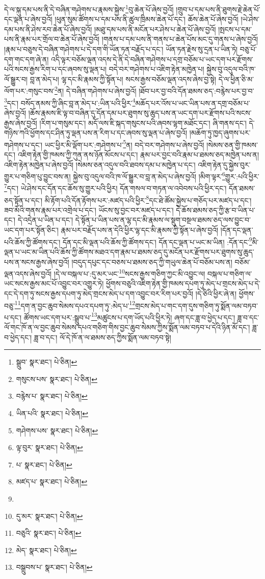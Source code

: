 དེ་ལ་སྐུ་དམ་པས་ནི་དེ་བཞིན་གཤེགས་པ་རྣམས་སྐྱེས་\footnote{སྒྲུབ་  སྣར་ཐང་།  པེ་ཅིན། }བུ་ཆེན་པོ་ཞེས་བྱའོ། །གྲུབ་པ་དམ་པས་ནི་ཐུགས་རྗེ་ཆེན་པོ་དང་ལྡན་པ་ཞེས་བྱའོ། །ཕུན་སུམ་ཚོགས་པ་དམ་པས་ནི་ཚུལ་ཁྲིམས་ཆེན་པོ་དང་། ཆོས་ཆེན་པོ་ཞེས་བྱའོ། །ཡེ་ཤེས་དམ་པས་ནི་ཤེས་རབ་ཆེན་པོ་ཞེས་བྱའོ། །མཐུ་དམ་པས་ནི་མངོན་པར་ཤེས་པ་ཆེན་པོ་ཞེས་བྱའོ། །སྤངས་པ་དམ་པས་ནི་རྣམ་པར་གྲོལ་བ་ཆེན་པོ་ཞེས་བྱའོ། །གནས་པ་དམ་པས་ནི་གནས་པ་ཆེན་པོས་མང་དུ་གནས་པ་ཞེས་བྱའོ། །རྣམ་པ་བཅུས་དེ་བཞིན་གཤེགས་པ་དེ་དག་གི་ཡོན་ཏན་བརྗོད་པ་དང་། ཡོན་ཏན་རྗེས་སུ་དྲན་པ་ཡིན་ཏེ། བཅུ་པོ་དག་གང་དག་ཞེ་ན། འདི་ལྟར་བཅོམ་ལྡན་འདས་དེ་ནི་དེ་བཞིན་གཤེགས་པ་དགྲ་བཅོམ་པ་ཡང་དག་པར་རྫོགས་པའི་སངས་རྒྱས་རིག་པ་དང་ཞབས་སུ་ལྡན་པ། བདེ་བར་གཤེགས་པ་འཇིག་རྟེན་མཁྱེན་པ། སྐྱེས་བུ་འདུལ་བའི་ཁ་ལོ་སྒྱུར་བ། བླ་ན་མེད་པ། ལྷ་དང་མི་རྣམས་ཀྱི་སྟོན་པ། སངས་རྒྱས་བཅོམ་ལྡན་འདས་ཞེས་བྱ་སྟེ། དེ་ལ་ཕྱིན་ཅི་མ་ལོག་པར་:གསུང་བས་\footnote{གསུངས་པས་  སྣར་ཐང་།  པེ་ཅིན། }ན། དེ་བཞིན་གཤེགས་པ་ཞེས་བྱའོ། །ཐོབ་པར་བྱ་བའི་དོན་ཐམས་ཅད་:བརྙེས་པར་བྱ་བ་\footnote{བརྙེས་པ་  སྣར་ཐང་།  པེ་ཅིན། }དང་། བསོད་ནམས་ཀྱི་ཞིང་བླ་ན་མེད་པ་:ཡིན་པའི་ཕྱིར་\footnote{ཡིན་པའི་  སྣར་ཐང་།  པེ་ཅིན། }མཆོད་པར་འོས་པ་ཡང་ཡིན་པས་ན་དགྲ་བཅོམ་པ་ཞེས་བྱའོ། །ཆོས་རྣམས་ཇི་ལྟ་བ་བཞིན་དུ་དོན་དམ་པར་ཐུགས་སུ་ཆུད་པས་ན་ཡང་དག་པར་རྫོགས་པའི་སངས་རྒྱས་ཞེས་བྱའོ། །རིག་པ་གསུམ་དང་། མདོ་ལས་ཇི་སྐད་གསུངས་པའི་ཞབས་ལྷག་མཐོང་དང་། ཞི་གནས་དང་། དེ་གཉིས་ཀའི་ཕྱོགས་དང་ཤིན་ཏུ་ལྡན་པས་ན་རིག་པ་དང་ཞབས་སུ་ལྡན་པ་ཞེས་བྱའོ། །མཆོག་ཏུ་ཁྱད་ཞུགས་པར་གཤེགས་པ་དང་། ཡང་ཕྱིར་མི་ལྡོག་པར་:གཤེགས་པ་\footnote{གཤེགས་པས་  སྣར་ཐང་།  པེ་ཅིན། }ན། བདེ་བར་གཤེགས་པ་ཞེས་བྱའོ། །སེམས་ཅན་གྱི་ཁམས་དང་། འཇིག་རྟེན་གྱི་ཁམས་ཀྱི་ཀུན་ནས་ཉོན་མོངས་པ་དང་། རྣམ་པར་བྱང་བའི་རྣམ་པ་ཐམས་ཅད་མཁྱེན་པས་ན། འཇིག་རྟེན་མཁྱེན་པ་ཞེས་བྱའོ། །སེམས་ཅན་འདུལ་བའི་ཐབས་དམ་པ་མཁྱེན་པ་དང་། འཇིག་རྟེན་དུ་སྐྱེས་བུར་གྱུར་པ་གཅིག་པུ་བྱུང་བས་ན། སྐྱེས་བུ་འདུལ་བའི་ཁ་ལོ་སྒྱུར་བ་བླ་ན་མེད་པ་ཞེས་བྱའོ། །མིག་ལྟར་\footnote{ལྟ་བུར་  སྣར་ཐང་།  པེ་ཅིན། }གྱུར་:པའི་ཕྱིར་\footnote{པ་  སྣར་ཐང་།  པེ་ཅིན། }དང་། ཡེ་ཤེས་དང་དོན་དང་ཆོས་སུ་གྱུར་པའི་ཕྱིར། དོན་གསལ་བ་གཏན་ལ་འབེབས་པའི་ཕྱིར་དང་། དོན་ཐམས་ཅད་སྟོན་པ་དང་། མི་རྟོག་པའི་དོན་རྟོགས་པར་:མཛད་པའི་ཕྱིར་\footnote{མཛད་པ་  སྣར་ཐང་།  པེ་ཅིན། }དང་ཐེ་ཚོམ་སྐྱེས་པ་གཅོད་པར་མཛད་པ་དང་། ཟབ་མོའི་གནས་རྣམ་པར་འགྲེལ་པ་དང་། ཡོངས་སུ་བྱང་བར་མཛད་པ་དང་། དེ་ཆོས་ཐམས་ཅད་ཀྱི་རྩ་བ་ཡིན་པ་དང་། དེ་འདྲེན་པ་ཡིན་པ་དང་། དེ་སྟོན་པ་ཡིན་པས་ན་ལྷ་དང་མི་རྣམས་ལ་སྡུག་བསྔལ་ཐམས་ཅད་ལས་བྱུང་བ་ཡང་དག་པར་སྟོན་ཅིང་། རྣམ་པར་བརྗོད་པས་ན་དེའི་ཕྱིར་ལྷ་དང་མི་རྣམས་ཀྱི་སྟོན་པ་ཞེས་བྱའོ། །དོན་དང་ལྡན་པའི་ཆོས་ཀྱི་ཚོགས་དང་། དོན་དང་མི་ལྡན་པའི་ཆོས་ཀྱི་ཚོགས་དང་། དོན་དང་ལྡན་པ་ཡང་མ་ཡིན། :དོན་དང་\footnote{}མི་ལྡན་པ་ཡང་མ་ཡིན་པའི་ཆོས་ཀྱི་ཚོགས་མཐའ་དག་རྣམ་པ་ཐམས་ཅད་དུ་མངོན་པར་རྫོགས་པར་ཐུགས་སུ་ཆུད་པས་ན་སངས་རྒྱས་ཞེས་བྱའོ། །བདུད་དཔུང་དང་བཅས་པ་ཐམས་ཅད་ཀྱི་གཡུལ་ཆེན་པོ་བཅོམ་པས་ན། བཅོམ་ལྡན་འདས་ཞེས་བྱའོ། །དེ་ལ་བསྐལ་པ་:དུ་མར་ཡང་\footnote{དུ་མར་  སྣར་ཐང་།  པེ་ཅིན། }སངས་རྒྱས་གཅིག་ཀྱང་མི་འབྱུང་ལ། བསྐལ་པ་གཅིག་ལ་ཡང་སངས་རྒྱས་མང་པོ་འབྱུང་བར་འགྱུར་ཏེ། ཕྱོགས་བཅུའི་འཇིག་རྟེན་གྱི་ཁམས་དཔག་ཏུ་མེད་པ་གྲངས་མེད་པ་དེ་དང་དེ་དག་ཏུ་སངས་རྒྱས་དཔག་ཏུ་མེད་གྲངས་མེད་པ་དག་འབྱུང་བར་རིག་པར་བྱའོ། །དེ་ཅིའི་ཕྱིར་ཞེ་ན། ཕྱོགས་བཅུ་\footnote{བཅུའི་  སྣར་ཐང་།  པེ་ཅིན། }དག་ན་བྱང་ཆུབ་སེམས་དཔའ་དཔག་ཏུ་:མེད་པ་\footnote{མེད་  སྣར་ཐང་།  པེ་ཅིན། }གྲངས་མེད་པ་གང་དག་དུས་གཅིག་ཏུ་སྨོན་ལམ་བཏབ་པ་དང་། ཚོགས་ཡང་དག་པར་:སྒྲུབ་པ་\footnote{བསྒྲུབས་པ་  སྣར་ཐང་།  པེ་ཅིན། }མཚུངས་པ་དག་ཡོད་པའི་ཕྱིར་ཏེ། ཞག་དང་ཟླ་བ་ཕྱེད་པ་དང་། ཟླ་བ་དང་ལོ་གང་ཁོ་ན་ལ་བྱང་ཆུབ་སེམས་དཔའ་གཅིག་གིས་བྱང་ཆུབ་སེམས་ཀྱིས་སྨོན་ལམ་བཏབ་པ་དེའི་ཉིན་མོ་དང་། ཟླ་བ་ཕྱེད་དང་། ཟླ་བ་དང་། ལོ་དེ་ཁོ་ན་ལ་ཐམས་ཅད་ཀྱིས་སྨོན་ལམ་བཏབ་སྟེ། 